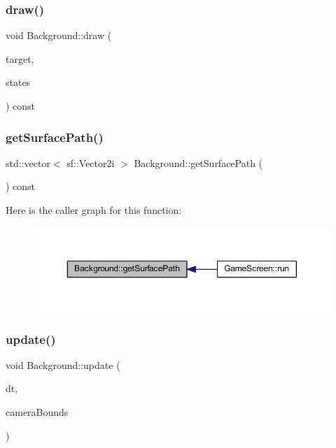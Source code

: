 \subsubsection{\texorpdfstring{draw()}{draw()}}
{\footnotesize\ttfamily void Background\+::draw (\begin{DoxyParamCaption}\item[{sf\+::\+Render\+Target \&}]{target,  }\item[{sf\+::\+Render\+States}]{states }\end{DoxyParamCaption}) const\hspace{0.3cm}{\ttfamily [virtual]}}

\mbox{\label{class_background_ac22dfc9ac10fd08906b6d68c323d625d}} 
\subsubsection{\texorpdfstring{get\+Surface\+Path()}{getSurfacePath()}}
{\footnotesize\ttfamily std\+::vector$<$ sf\+::\+Vector2i $>$ Background\+::get\+Surface\+Path (\begin{DoxyParamCaption}{ }\end{DoxyParamCaption}) const}

Here is the caller graph for this function\+:
\nopagebreak
\begin{figure}[H]
\begin{center}
\leavevmode
\includegraphics[width=350pt]{class_background_ac22dfc9ac10fd08906b6d68c323d625d_icgraph}
\end{center}
\end{figure}
\mbox{\label{class_background_ae9ead480fcfa060468305134b11e1f40}} 
\subsubsection{\texorpdfstring{update()}{update()}}
{\footnotesize\ttfamily void Background\+::update (\begin{DoxyParamCaption}\item[{float}]{dt,  }\item[{const sf\+::\+Float\+Rect \&}]{camera\+Bounds }\end{DoxyParamCaption})}

